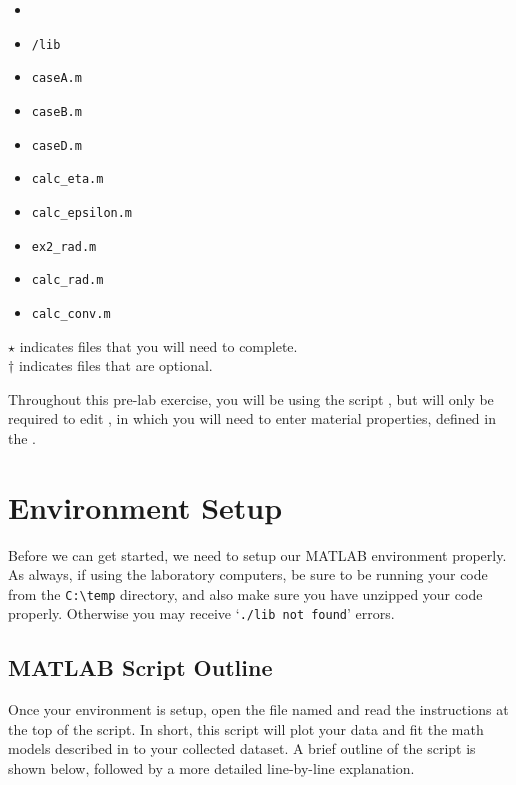 \documentclass[11pt, letterpaper]{article}
\begin{document}
\begin{itemize}
\renewcommand\labelitemi{-- }
   \item {}
    \item \texttt{/lib}
    \item  \texttt{caseA.m}
\renewcommand\labelitemi{[$\star$]}
    \item \texttt{caseB.m}
    \item \texttt{caseD.m} 
    \item \texttt{calc\_eta.m} 
    \item \texttt{calc\_epsilon.m} 
\renewcommand\labelitemi{[$\dag$]}
    \item \texttt{ex2\_rad.m} 
    \item \texttt{calc\_rad.m}
    \item \texttt{calc\_conv.m}  
\end{itemize}

\noindent
$\star$ indicates files that you will need to complete.\\
$\dag$ indicates files that are optional.

\n
Throughout this pre-lab exercise, you will be using the script , but will only be required to edit , in which you will need to enter material properties, defined in the .


\setcounter{section}{-1}
\section{Environment Setup}
Before we can get started, we need to setup our MATLAB environment properly. As always, if using the laboratory computers, be sure to be running your code from the \texttt{C:\textbackslash temp} directory, and also make sure you have unzipped your code properly. Otherwise you may receive `\texttt{./lib not found}' errors.

\subsection{MATLAB Script Outline}

Once your environment is setup, open the file named  and read the instructions at the top of the script. In short, this script will plot your data and fit the math models described in  to your collected dataset. A brief outline of the script is shown below, followed by a more detailed line-by-line explanation.
\n
\end{document}
